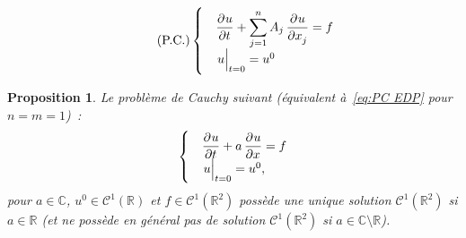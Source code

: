 \documentclass{report}
\newcommand{\C}{{\mathbb C}}
\newcommand{\R}{{\mathbb R}}
\newcommand{\restr}[2]{\left.#1\vphantom{\big|}\right|_{#2}}
\newtheorem{prp}[thm]{Proposition}
\theoremstyle{definition}
\theoremstyle{remark}
\begin{document}
\begin{equation}\label{eq:PC EDP}\tag{P.C.}
	\begin{cases}&\dpd ut + \displaystyle \sum_{j=1}^nA_j\dpd u{x_j} = f\\&\restr u{t=0} = u^0\end{cases}
\end{equation}

\begin{prp} Le problème de Cauchy suivant (équivalent à~\eqref{eq:PC EDP} pour $n=m=1$)~:
\[\begin{cases}&\dpd ut + a\dpd ux = f\\&\restr u{t=0} = u^0,\end{cases}\]
pour $a \in \C$, $u^0 \in \mathcal C^1(\R)$ et $f \in \mathcal C^1(\R^2)$ possède une unique solution $\mathcal C^1(\R^2)$ si $a \in \R$ (et ne possède en général pas de solution $\mathcal C^1(\R^2)$
si $a \in \C \setminus \R$).
\end{prp}
\end{document}
